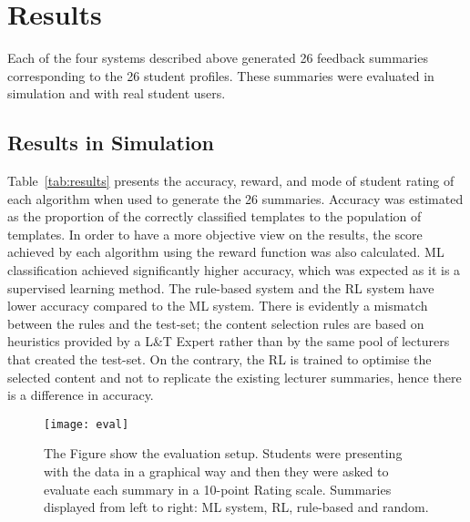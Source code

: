 \documentclass[11pt]{article}
\begin{document}
\section{Results} \label{results}

Each of the four systems described above generated 26 feedback
summaries corresponding to the 
26 student profiles. These summaries were evaluated in simulation and
with real student users. 

\subsection{Results in Simulation}


Table~\ref{tab:results} presents the accuracy, reward, and mode of
student rating of each algorithm when used
to generate the 26 summaries.  
Accuracy was estimated as the proportion of the correctly 
classified templates to the population of templates. In order to have a more objective view on the results, the score achieved by each algorithm using the reward
function was also calculated.  
ML classification achieved significantly higher accuracy, which was expected as it is a supervised learning method. 
The rule-based system and the RL system have lower accuracy compared to the ML
system. There is evidently a mismatch between the rules and the
test-set; the content selection rules are based on heuristics provided by a L\&T Expert rather than by the same pool of lecturers that
created the test-set. On the contrary, the RL is trained to optimise the
selected content and not to replicate 
the existing lecturer summaries, hence there is a difference in accuracy.




\begin{figure*}[ht!]
\centering
\texttt{[image: eval]}
\footnotesize \caption{The Figure show the evaluation setup. Students were presenting with the data in 
a graphical way and then they were asked to evaluate each summary in a 10-point Rating scale.
Summaries displayed from left to right: ML system, RL, rule-based and random.}
\label{evaluationscreen}
\end{figure*}
\end{document}
